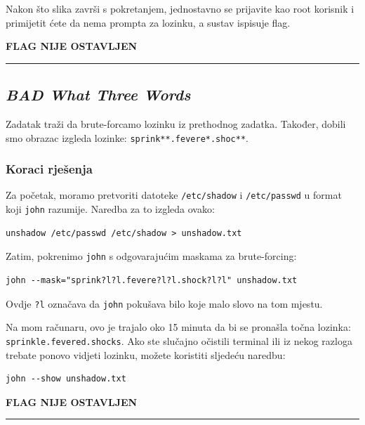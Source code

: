 \documentclass{article}
\begin{document}
Nakon što slika završi s pokretanjem, jednostavno se prijavite kao root korisnik i primijetit ćete da nema prompta za lozinku, a sustav ispisuje flag.
\begin{center}
    \textbf{FLAG NIJE OSTAVLJEN}
\end{center}

\noindent\rule{\textwidth}{0.4pt}

\subsection{\textit{BAD What Three Words}}
\begin{tcolorbox}[
    colback=gray!5,  %
    colframe=gray!75,  %
    title=\textbf{Zadatak}]
    Zadatak traži da brute-forcamo lozinku iz prethodnog zadatka. Također, dobili smo obrazac izgleda lozinke: \texttt{sprink**.fevere*.shoc**}.
\end{tcolorbox}

\subsubsection*{Koraci rješenja}
Za početak, moramo pretvoriti datoteke \texttt{/etc/shadow} i \texttt{/etc/passwd} u format koji \texttt{john} razumije. Naredba za to izgleda ovako:
\begin{verbatim}
unshadow /etc/passwd /etc/shadow > unshadow.txt
\end{verbatim}

Zatim, pokrenimo \texttt{john} s odgovarajućim maskama za brute-forcing:
\begin{verbatim}
john --mask="sprink?l?l.fevere?l?l.shock?l?l" unshadow.txt
\end{verbatim}

Ovdje \texttt{?l} označava da \texttt{john} pokušava bilo koje malo slovo na tom mjestu.

Na mom računaru, ovo je trajalo oko 15 minuta da bi se pronašla točna lozinka: \texttt{sprinkle.fevered.shocks}. Ako ste slučajno očistili terminal ili iz nekog razloga trebate ponovo vidjeti lozinku, možete koristiti sljedeću naredbu:
\begin{verbatim}
john --show unshadow.txt
\end{verbatim}

\begin{center}
    \textbf{FLAG NIJE OSTAVLJEN}
\end{center}

\noindent\rule{\textwidth}{0.4pt}
\end{document}
